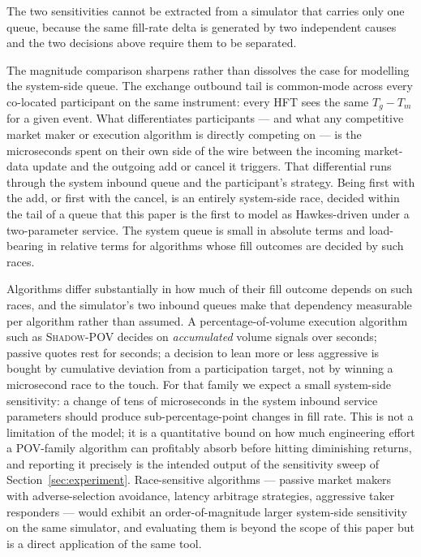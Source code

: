 \documentclass[11pt]{article}
\newcommand{\shadowpov}{\textsc{Shadow-POV}}
\begin{document}
The two sensitivities cannot be extracted from a simulator that carries only one queue, because the same fill-rate delta is generated by two independent causes and the two decisions above require them to be separated.

The magnitude comparison sharpens rather than dissolves the case for modelling the system-side queue. The exchange outbound tail is common-mode across every co-located participant on the same instrument: every HFT sees the same $T_g - T_m$ for a given event. What differentiates participants --- and what any competitive market maker or execution algorithm is directly competing on --- is the microseconds spent on their own side of the wire between the incoming market-data update and the outgoing add or cancel it triggers. That differential runs through the system inbound queue and the participant's strategy. Being first with the add, or first with the cancel, is an entirely system-side race, decided within the tail of a queue that this paper is the first to model as Hawkes-driven under a two-parameter service. The system queue is small in absolute terms and load-bearing in relative terms for algorithms whose fill outcomes are decided by such races.

Algorithms differ substantially in how much of their fill outcome depends on such races, and the simulator's two inbound queues make that dependency measurable per algorithm rather than assumed. A percentage-of-volume execution algorithm such as \shadowpov{} decides on \emph{accumulated} volume signals over seconds; passive quotes rest for seconds; a decision to lean more or less aggressive is bought by cumulative deviation from a participation target, not by winning a microsecond race to the touch. For that family we expect a small system-side sensitivity: a change of tens of microseconds in the system inbound service parameters should produce sub-percentage-point changes in fill rate. This is not a limitation of the model; it is a quantitative bound on how much engineering effort a POV-family algorithm can profitably absorb before hitting diminishing returns, and reporting it precisely is the intended output of the sensitivity sweep of Section~\ref{sec:experiment}. Race-sensitive algorithms --- passive market makers with adverse-selection avoidance, latency arbitrage strategies, aggressive taker responders --- would exhibit an order-of-magnitude larger system-side sensitivity on the same simulator, and evaluating them is beyond the scope of this paper but is a direct application of the same tool.
\end{document}
